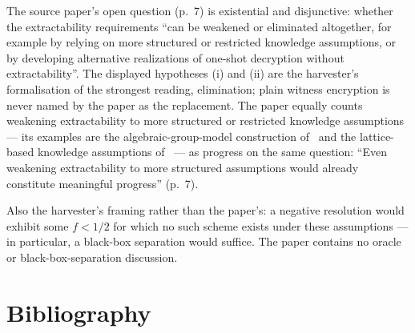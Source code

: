 \documentclass{conjura-conjecture}
\begin{document}
\begin{remark}\label{rem:scope}
The source paper's open question (p.~7) is existential and
disjunctive: whether the extractability requirements ``can be weakened
or eliminated altogether, for example by relying on more structured or
restricted knowledge assumptions, or by developing alternative
realizations of one-shot decryption without extractability''. The
displayed hypotheses (i) and (ii) are the harvester's formalisation of
the strongest reading, elimination; plain witness encryption is never
named by the paper as the replacement. The paper equally counts
weakening extractability to more structured or restricted knowledge
assumptions --- its examples are the algebraic-group-model
construction of~\cite{FHAS24} and the lattice-based knowledge
assumptions of~\cite{ACL+22} --- as progress on the same question:
``Even weakening extractability to more structured assumptions would
already constitute meaningful progress'' (p.~7).

Also the harvester's framing rather than the paper's: a negative
resolution would exhibit some $f < 1/2$ for which no such scheme
exists under these assumptions --- in particular, a black-box
separation would suffice. The paper contains no oracle or
black-box-separation discussion.
\end{remark}

\section{Bibliography}
\end{document}
